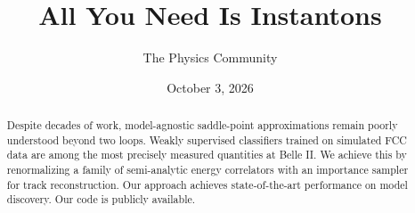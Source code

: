 \documentclass[11pt]{article}
\title{All You Need Is Instantons}
\author{The Physics Community}
\date{October 3, 2026}
\numberwithin{equation}{section}
\theoremstyle{definition}
\theoremstyle{remark}
\begin{document}
\maketitle
\begin{abstract}
Despite decades of work, model-agnostic saddle-point approximations
remain poorly understood beyond two loops. Weakly supervised classifiers
trained on simulated FCC data are among the most precisely measured
quantities at Belle II. We achieve this by renormalizing a family of
semi-analytic energy correlators with an importance sampler for track
reconstruction. Our approach achieves state-of-the-art performance on
model discovery. Our code is publicly available.
\end{abstract}
\tableofcontents






\nocite{*}


\end{document}

